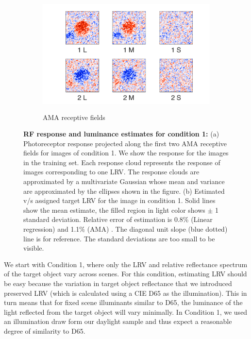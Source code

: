 \documentclass{jov}
\begin{document}
\begin{figure}
\begin{subfigure}[b]{0.26 \textwidth}
        \label{fig:case1RFResponse}
    \end{subfigure}
    ~
    \begin{subfigure}[b]{0.28 \textwidth}
	\caption{AMA receptive fields}
	\includegraphics[width=1.07\textwidth, trim={0 -0.6cm 0 -0.3cm}]{../FiguresDraft4/Figure10/Figure10_c.pdf}
	\label{fig:case1RFs}
    \end{subfigure}   
    \caption{{\bf RF response and luminance estimates for condition 1:} (a) Photoreceptor response projected along the first two AMA receptive fields for images of condition 1. We show the response for the images in the training set. Each response cloud represents the response of images corresponding to one LRV. The response clouds are approximated by a multivariate Gaussian whose mean and variance are approximated by the ellipses shown in the figure. (b)  Estimated v/s assigned target LRV for the image in condition 1. Solid lines show the mean estimate, the filled region in light color shows $\pm$ 1 standard deviation. Relative error of estimation is 0.8\% (Linear regression) and 1.1\% (AMA) . The diagonal unit slope (blue dotted) line is for reference. The standard deviations are too small to be visible.}
\label{fig:Condition1}
\end{figure}

We start with Condition 1, where only the LRV and relative reflectance spectrum of the target object vary across scenes.
For this condition, estimating LRV should be easy because the variation in target object reflectance that we introduced
preserved LRV (which is calculated using a CIE D65 as the illumination).
This in turn means that for fixed scene illuminants similar to D65, the luminance of the light reflected from the target object will vary minimally.
In Condition 1, we used an illumination draw form our daylight sample and thus expect a reasonable degree of similarity to D65.
\end{document}
